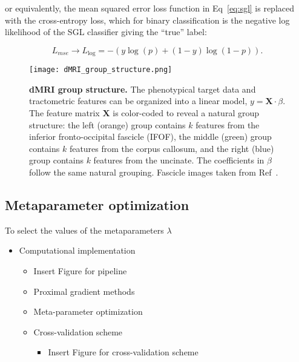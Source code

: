 or equivalently, the mean squared error loss function in Eq~\eqref{eq:sgl} is
replaced with the cross-entropy loss, which for binary classification is the
negative log likelihood of the SGL classifier giving the ``true'' label:

\begin{equation}
    L_{mse} \rightarrow L_{\log} = -\left(y \log(p) + (1 - y) \log(1 - p)\right).
    \label{eq:logloss}
\end{equation}


\begin{figure}[!h]
    \centering
    \texttt{[image: dMRI\_group\_structure.png]}
    \caption{{\bf dMRI group structure.}
        The phenotypical target data and tractometric features can be organized
    into a linear model, $y = \mathbf{X} \cdot \beta$. The feature matrix
    $\mathbf{X}$ is color-coded to reveal a natural group structure: the left
    (orange) group contains $k$ features from the inferior fronto-occipital
    fascicle (IFOF), the middle (green) group contains $k$ features from the
    corpus callosum, and the right (blue) group contains $k$ features from the
    uncinate. The coefficients in $\beta$ follow the same natural grouping.
    Fascicle images taken from Ref~\cite{yeatman2012tract}.}
    \label{fig:group-structure}
\end{figure}


\subsection*{Metaparameter optimization}

To select the values of the metaparameters $\lambda$

\begin{itemize}
  \item Computational implementation
    \begin{itemize}
      \item Insert Figure for pipeline
      \item Proximal gradient methods
      \item Meta-parameter optimization
      \item Cross-validation scheme
        \begin{itemize}
          \item Insert Figure for cross-validation scheme
        \end{itemize}
    \end{itemize}
\end{itemize}


